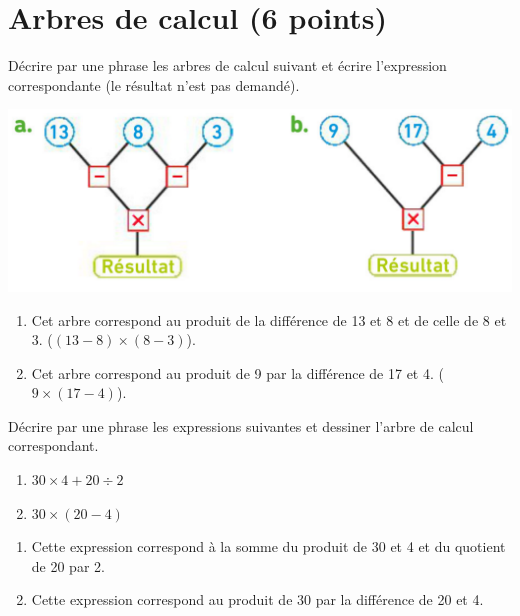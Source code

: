 \section{Arbres de calcul (6 points)}

\begin{questions}
	\question[3] Décrire par une phrase les arbres de calcul suivant et écrire l'expression correspondante (le résultat n'est pas demandé).
	
	
	\begin{center}
		\includegraphics[scale=0.3]{img/arbres}
	\end{center}
	
	\begin{solution}
		\begin{enumerate}
			\item Cet arbre correspond au produit de la différence de 13 et 8 et de celle de 8 et 3. ($(13 - 8) \times (8 - 3)$).
			
			\item Cet arbre correspond au produit de 9 par la différence de 17 et 4. ($9 \times (17 - 4)$).
		\end{enumerate}
	\end{solution}
	\question[3] Décrire par une phrase les expressions suivantes et dessiner l'arbre de calcul correspondant.
	
	\begin{multicols}{2}
		\begin{enumerate}
			\item $30 \times 4 + 20 \div 2$
			\item $30 \times (20 - 4)$
		\end{enumerate}
	\end{multicols}	

	
	\begin{solution}
		\begin{multicols}{2}
			\begin{enumerate}
				\item Cette expression correspond à la somme du produit de 30 et 4 et du quotient de 20 par 2.
					
				\item Cette expression correspond au produit de 30 par la différence de 20 et 4.
			\end{enumerate}
		
		\end{multicols}
	\end{solution}
	
\end{questions}
